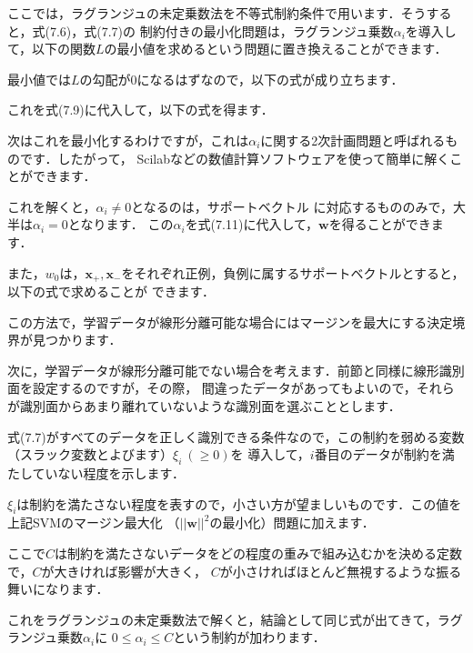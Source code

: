 
ここでは，ラグランジュの未定乗数法を不等式制約条件で用います．そうすると，式(7.6)，式(7.7)の
制約付きの最小化問題は，ラグランジュ乗数$\alpha_i$を導入して，以下の関数$L$の最小値を求めるという問題に置き換えることができます．


最小値では$L$の勾配が0になるはずなので，以下の式が成り立ちます．

これを式(7.9)に代入して，以下の式を得ます．

次はこれを最小化するわけですが，これは$\alpha_i$に関する2次計画問題と呼ばれるものです．したがって，
Scilabなどの数値計算ソフトウェアを使って簡単に解くことができます．

これを解くと，$\alpha_i \neq 0$となるのは，サポートベクトル
に対応するもののみで，大半は$\alpha_i = 0$となります．
この$\alpha_i$を式(7.11)に代入して，$\bm{w}$を得ることができます．


また，$w_0$は，$\bm{x}_{+}, \bm{x}_{-}$をそれぞれ正例，負例に属するサポートベクトルとすると，以下の式で求めることが
できます．

この方法で，学習データが線形分離可能な場合にはマージンを最大にする決定境界が見つかります．


次に，学習データが線形分離可能でない場合を考えます．前節と同様に線形識別面を設定するのですが，その際，
間違ったデータがあってもよいので，それらが識別面からあまり離れていないような識別面を選ぶこととします．


式(7.7)がすべてのデータを正しく識別できる条件なので，この制約を弱める変数（スラック変数とよびます）$\xi_i ~ (\ge 0)$を
導入して，$i$番目のデータが制約を満たしていない程度を示します．

$\xi_i$は制約を満たさない程度を表すので，小さい方が望ましいものです．この値を上記SVMのマージン最大化
（$|| \bm{w} ||^2$の最小化）問題に加えます．


ここで$C$は制約を満たさないデータをどの程度の重みで組み込むかを決める定数で，$C$が大きければ影響が大きく，
$C$が小さければほとんど無視するような振る舞いになります．


これをラグランジュの未定乗数法で解くと，結論として同じ式が出てきて，ラグランジュ乗数$\alpha_i$に
$0 \le \alpha_i \le C$という制約が加わります．

